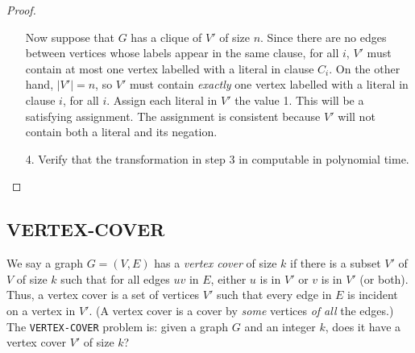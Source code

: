 \documentclass[12pt]{article}
\theoremstyle{plain}
\theoremstyle{definition}
\newcommand{\lecture}[1]{\marginpar{{\footnotesize $\leftarrow$ \underline{#1}}}}
\begin{document}
\begin{proof}
\begin{enumerate}
  Now suppose that $G$ has a clique of $V'$ of size $n$.
  Since there are no edges between vertices whose labels appear in the same clause, for all $i$, $V'$ must contain at most one vertex labelled with a literal in clause $C_{i}$.
  On the other hand, $|V'| = n$, so $V'$ must contain \emph{exactly} one vertex labelled with a literal in clause $i$, for all $i$.
  Assign each literal in $V'$ the value 1.
  This will be a satisfying assignment.
  The assignment is consistent because $V'$ will not contain both a literal and its negation.

  \item[4.] Verify that the transformation in step 3 in computable in polynomial time.
\end{enumerate}
\end{proof}

\subsection{VERTEX-COVER}
\lecture{2016/11/29}
We say a graph $G = (V, E)$ has a \emph{vertex cover} of size $k$ if there is a subset $V'$ of $V$ of size $k$ such that for all edges $uv$ in $E$, either $u$ is in $V'$ or $v$ is in $V'$ (or both).
Thus, a vertex cover is a set of vertices $V'$ such that every edge in $E$ is incident on a vertex in $V'$. (A vertex cover is a cover by \emph{some} vertices \emph{of all} the edges.) \\

The \texttt{VERTEX-COVER} problem is: given a graph $G$ and an integer $k$, does it have a vertex cover $V'$ of size $k$?
\end{document}

